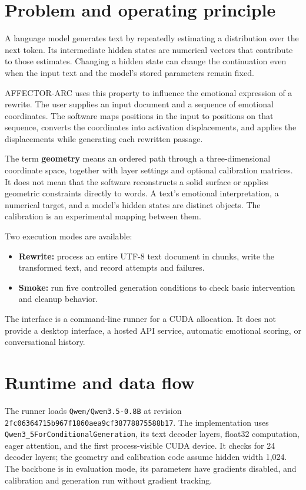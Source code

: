 \documentclass[manuscript,screen,nonacm]{acmart}
\providecommand{\tightlist}{\setlength{\itemsep}{0pt}\setlength{\parskip}{0pt}}
\begin{document}
\section{Problem and operating
principle}\label{problem-and-operating-principle}

A language model generates text by repeatedly estimating a distribution
over the next token. Its intermediate hidden states are numerical
vectors that contribute to those estimates. Changing a hidden state can
change the continuation even when the input text and the model's stored
parameters remain fixed.

AFFECTOR-ARC uses this property to influence the emotional expression of
a rewrite. The user supplies an input document and a sequence of
emotional coordinates. The software maps positions in the input to
positions on that sequence, converts the coordinates into activation
displacements, and applies the displacements while generating each
rewritten passage.

The term \textbf{geometry} means an ordered path through a
three-dimensional coordinate space, together with layer settings and
optional calibration matrices. It does not mean that the software
reconstructs a solid surface or applies geometric constraints directly
to words. A text's emotional interpretation, a numerical target, and a
model's hidden states are distinct objects. The calibration is an
experimental mapping between them.

Two execution modes are available:

\begin{itemize}
\tightlist
\item
  \textbf{Rewrite:} process an entire UTF-8 text document in chunks,
  write the transformed text, and record attempts and failures.
\item
  \textbf{Smoke:} run five controlled generation conditions to check
  basic intervention and cleanup behavior.
\end{itemize}

The interface is a command-line runner for a CUDA allocation. It does
not provide a desktop interface, a hosted API service, automatic
emotional scoring, or conversational history.

\section{Runtime and data flow}\label{runtime-and-data-flow}

The runner loads \nolinkurl{Qwen/Qwen3.5-0.8B} at revision
\nolinkurl{2fc06364715b967f1860aea9cf38778875588b17}. The implementation
uses \nolinkurl{Qwen3_5ForConditionalGeneration}, its text decoder layers,
float32 computation, eager attention, and the first process-visible CUDA
device. It checks for 24 decoder layers; the geometry and calibration
code assume hidden width 1,024. The backbone is in evaluation mode, its
parameters have gradients disabled, and calibration and generation run
without gradient tracking.
\end{document}
